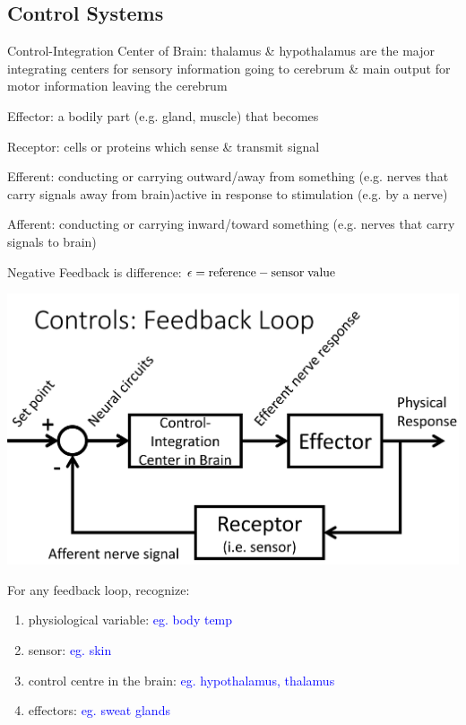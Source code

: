 \documentclass[11pt,fleqn]{book} %
\begin{document}
\subsection{Control Systems}
\begin{descriptions}
    \item[Control-Integration Center of Brain:]  thalamus \& hypothalamus are the major integrating centers for sensory information going to cerebrum \& main output for motor information leaving the cerebrum
    \item[Effector:] a bodily part (e.g. gland, muscle) that becomes 
    \item[Receptor:] cells or proteins which sense \& transmit signal
    \item[Efferent:] conducting or carrying outward/away from something (e.g. nerves that carry signals away from brain)active in response to stimulation (e.g. by a nerve)
    \item[Afferent:] conducting or carrying inward/toward something (e.g. nerves that carry signals to brain)
    \item[Negative Feedback] is difference: $\epsilon={\rm reference}-{\rm sensor\;value}$
\end{descriptions}
\begin{center}
    \includegraphics[width=0.65\linewidth]{Pictures/Screenshot 2024-02-25 175821.png}
\end{center}
\begin{exercise}
    For any feedback loop, recognize:
    \begin{enumerate}
        \item physiological variable: \textcolor{blue}{eg. body temp}
        \item sensor: \textcolor{blue}{eg. skin}
        \item control centre in the brain: \textcolor{blue}{eg. hypothalamus, thalamus}
        \item effectors: \textcolor{blue}{eg. sweat glands}
    \end{enumerate}
\end{exercise}
\end{document}
